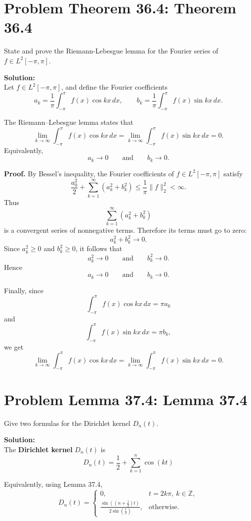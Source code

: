 \documentclass[a4paper]{article}
\theoremstyle{definition}
\newcounter{problem}
\newenvironment{problem}[1][]
{
    \stepcounter{problem}
    \section*{Problem \theproblem\ifx\relax#1\relax\else: #1\fi}
}
{}
\newenvironment{solution}
{
    \noindent\textbf{Solution:}\\
}
{
    
}
\begin{document}
\newpage
\begin{problem}[Theorem 36.4]
State and prove the Riemann-Lebesgue lemma for the Fourier series of $f \in L^2[-\pi,\pi]$.
\end{problem}

\vspace{2em}
\begin{solution}
Let \(f\in L^2[-\pi,\pi]\), and define the Fourier coefficients
\[
    a_k=\frac{1}{\pi}\int_{-\pi}^{\pi} f(x)\cos kx\,dx,
    \qquad
    b_k=\frac{1}{\pi}\int_{-\pi}^{\pi} f(x)\sin kx\,dx.
\]

The Riemann--Lebesgue lemma states that
\[
    \lim_{k\to\infty}\int_{-\pi}^{\pi} f(x)\cos kx\,dx
    =
    \lim_{k\to\infty}\int_{-\pi}^{\pi} f(x)\sin kx\,dx
    =
    0.
\]
Equivalently,
\[
    a_k\to 0
    \qquad\text{and}\qquad
    b_k\to 0.
\]

\textbf{Proof.}
By Bessel's inequality, the Fourier coefficients of \(f\in L^2[-\pi,\pi]\)
satisfy
\[
    \frac{a_0^2}{2}
    +
    \sum_{k=1}^{\infty}(a_k^2+b_k^2)
    \leq
    \frac{1}{\pi}\|f\|_2^2
    <\infty.
\]
Thus
\[
    \sum_{k=1}^{\infty}(a_k^2+b_k^2)
\]
is a convergent series of nonnegative terms. Therefore its terms must go to
zero:
\[
    a_k^2+b_k^2\to 0.
\]
Since \(a_k^2\geq 0\) and \(b_k^2\geq 0\), it follows that
\[
    a_k^2\to 0
    \qquad\text{and}\qquad
    b_k^2\to 0.
\]
Hence
\[
    a_k\to 0
    \qquad\text{and}\qquad
    b_k\to 0.
\]

Finally, since
\[
    \int_{-\pi}^{\pi} f(x)\cos kx\,dx=\pi a_k
\]
and
\[
    \int_{-\pi}^{\pi} f(x)\sin kx\,dx=\pi b_k,
\]
we get
\[
    \lim_{k\to\infty}\int_{-\pi}^{\pi} f(x)\cos kx\,dx
    =
    \lim_{k\to\infty}\int_{-\pi}^{\pi} f(x)\sin kx\,dx
    =
    0.
\]
\end{solution}

\newpage
\begin{problem}[Lemma 37.4]
Give two formulas for the Dirichlet kernel $D_n(t)$.
\end{problem}

\vspace{2em}
\begin{solution}
The \textbf{Dirichlet kernel} $D_n(t)$ is
\[
D_n(t)
=
\frac12+\sum_{k=1}^{n}\cos(kt)
\]

\vspace{2em}
\noindent Equivalently, using Lemma 37.4,
\[
D_n(t)=
\begin{cases}
0, & t=2k\pi,\ k\in\mathbb{Z},\\[6pt]
\displaystyle
\frac{\sin\left(\left(n+\frac12\right)t\right)}
{2\sin\left(\frac{t}{2}\right)},
& \text{otherwise}.
\end{cases}
\]
\end{solution}
\end{document}
